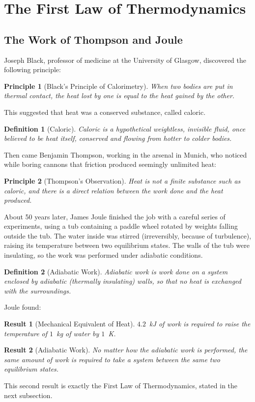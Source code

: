 \documentclass{article}
\newtheorem{principle}{Principle}
\newtheorem{definition}{Definition}
\newtheorem{result}{Result}
\begin{document}
\section{The First Law of Thermodynamics}
\subsection{The Work of Thompson and Joule}
Joseph Black, professor of medicine at the University of Glasgow, discovered the following principle:
\begin{principle}[Black's Principle of Calorimetry]
    When two bodies are put in thermal contact, the heat lost by one is equal to the heat gained by the other.
\end{principle}
This suggested that heat was a conserved substance, called caloric.
\begin{definition}[Caloric]
    Caloric is a hypothetical weightless, invisible fluid, once believed to be heat itself, conserved and flowing from hotter to colder bodies.
\end{definition}
Then came Benjamin Thompson, working in the arsenal in Munich, who noticed while boring cannons that friction produced seemingly unlimited heat:
\begin{principle}[Thompson's Observation]
    Heat is not a finite substance such as caloric, and there is a direct relation between the work done and the heat produced.
\end{principle}
About 50 years later, James Joule finished the job with a careful series of experiments, using a tub containing a paddle wheel rotated by weights falling outside the tub. The water inside was stirred (irreversibly, because of turbulence), raising its temperature between two equilibrium states. The walls of the tub were insulating, so the work was performed under adiabatic conditions.
\begin{definition}[Adiabatic Work]
    \label{def:adiabatic-work}
    Adiabatic work is work done on a system enclosed by adiabatic (thermally insulating) walls, so that no heat is exchanged with the surroundings.
\end{definition}
Joule found:
\begin{result}[Mechanical Equivalent of Heat]
    $4.2$~kJ of work is required to raise the temperature of $1$~kg of water by $1$~K.
\end{result}
\begin{result}[Adiabatic Work]
    No matter how the adiabatic work is performed, the same amount of work is required to take a system between the same two equilibrium states.
\end{result}
This second result is exactly the First Law of Thermodynamics, stated in the next subsection.
\end{document}
